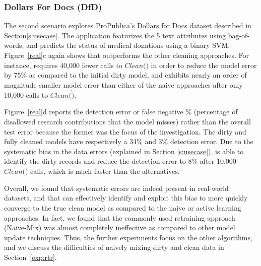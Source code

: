 \subsubsection{Dollars For Docs (DfD)}\label{exp:dfd}
The second scenario explores ProPublica's Dollars for Docs dataset described in Section\ref{s:usecase}.
The application featurizes the 5 text attributes using bag-of-words, and predicts the status of medical donations using a binary SVM.
Figure~\ref{real}c again shows that \sys outperforms the other cleaning approaches.
For instance, \sys requires 40,000 fewer calls to $Clean(\dot)$ in order to reduce the model error by $75\%$ as compared to the initial dirty model,
and exhibits nearly an order of magnitude smaller model error than either of the naive approaches after only 10,000 calls to $Clean(\dot)$.

Figure~\ref{real}d reports the detection error or false negative \% (percentage of disallowed research contributions that the model misses) rather than the overall test error because the former was the focus of the investigation.  The dirty and fully cleaned models have respectively a 34\% and 3\% detection error.
Due to the systematic bias in the data errors (explained in Section \ref{s:usecase}), \sys is able to identify the dirty records and
reduce the detection error to 8\% after 10,000 $Clean(\dot)$ calls, which is much faster than the alternatives.

Overall, we found that systematic errors are indeed present in real-world datasets, and that \sys can effectively identify and exploit this bias
to more quickly converge to the true clean model as compared to the naive or active learning approaches.  
In fact, we found that the commonly used retraining approach (Naive-Mix) was almost completely ineffective as compared to other model update techniques.
Thus, the further experiments focus on the other algorithms, and we discuss the difficulties of naively mixing dirty and clean data in Section~\ref{exp:rtr}.



